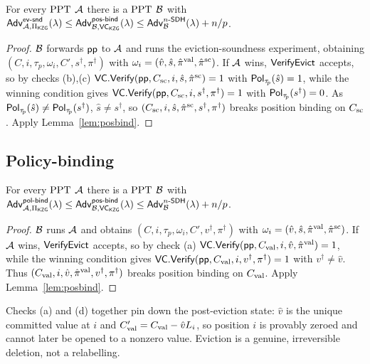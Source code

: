 \begin{theorem}\label{thm:evsnd}
For every $\mathrm{PPT}$ $\mathcal{A}$ there is a $\mathrm{PPT}$ $\mathcal{B}$ with
$\mathsf{Adv}^{\mathsf{ev\text{-}snd}}_{\mathcal{A},\Pi_{\mathsf{KZG}}}(\lambda)\le
 \mathsf{Adv}^{\mathsf{pos\text{-}bind}}_{\mathcal{B},\mathsf{VC}_{\mathsf{KZG}}}(\lambda)\le\mathsf{Adv}^{n\text{-}\mathsf{SDH}}_{\mathcal{B}}(\lambda)+n/p$.
\end{theorem}
\begin{proof}
$\mathcal{B}$ forwards $\mathsf{pp}$ to $\mathcal{A}$ and runs the eviction-soundness experiment, obtaining
$(C,i,\tau_{\!p},\omega_i,C',s^{\dagger},\pi^{\dagger})$ with
$\omega_i=(\hat v,\hat s,\hat\pi^{\mathrm{val}},\hat\pi^{\mathrm{sc}})$. If $\mathcal{A}$ wins,
$\mathsf{VerifyEvict}$ accepts, so by checks (b),(c)
$\mathsf{VC}.\mathsf{Verify}(\mathsf{pp},C_{\mathrm{sc}},i,\hat s,\hat\pi^{\mathrm{sc}})=1$ with $\mathsf{Pol}_{\tau_{\!p}}(\hat s)=1$,
while the winning condition gives
$\mathsf{VC}.\mathsf{Verify}(\mathsf{pp},C_{\mathrm{sc}},i,s^{\dagger},\pi^{\dagger})=1$ with
$\mathsf{Pol}_{\tau_{\!p}}(s^{\dagger})=0$. As $\mathsf{Pol}_{\tau_{\!p}}(\hat s)\neq
\mathsf{Pol}_{\tau_{\!p}}(s^{\dagger})$, $\hat s\neq s^{\dagger}$, so
$(C_{\mathrm{sc}},i,\hat s,\hat\pi^{\mathrm{sc}},s^{\dagger},\pi^{\dagger})$ breaks position binding
on $C_{\mathrm{sc}}$. Apply Lemma~\ref{lem:posbind}.
\end{proof}

\subsection{Policy-binding}

\begin{theorem}\label{thm:polbind}
For every $\mathrm{PPT}$ $\mathcal{A}$ there is a $\mathrm{PPT}$ $\mathcal{B}$ with
$\mathsf{Adv}^{\mathsf{pol\text{-}bind}}_{\mathcal{A},\Pi_{\mathsf{KZG}}}(\lambda)\le
 \mathsf{Adv}^{\mathsf{pos\text{-}bind}}_{\mathcal{B},\mathsf{VC}_{\mathsf{KZG}}}(\lambda)\le\mathsf{Adv}^{n\text{-}\mathsf{SDH}}_{\mathcal{B}}(\lambda)+n/p$.
\end{theorem}
\begin{proof}
$\mathcal{B}$ runs $\mathcal{A}$ and obtains
$(C,i,\tau_{\!p},\omega_i,C',v^{\dagger},\pi^{\dagger})$ with
$\omega_i=(\hat v,\hat s,\hat\pi^{\mathrm{val}},\hat\pi^{\mathrm{sc}})$. If $\mathcal{A}$ wins,
$\mathsf{VerifyEvict}$ accepts, so by check (a)
$\mathsf{VC}.\mathsf{Verify}(\mathsf{pp},C_{\mathrm{val}},i,\hat v,\hat\pi^{\mathrm{val}})=1$, while the winning condition gives
$\mathsf{VC}.\mathsf{Verify}(\mathsf{pp},C_{\mathrm{val}},i,v^{\dagger},\pi^{\dagger})=1$ with $v^{\dagger}\neq\hat v$.
Thus $(C_{\mathrm{val}},i,\hat v,\hat\pi^{\mathrm{val}},v^{\dagger},\pi^{\dagger})$ breaks position
binding on $C_{\mathrm{val}}$. Apply Lemma~\ref{lem:posbind}.
\end{proof}

\begin{remark}
Checks (a) and (d) together pin down the post-eviction state: $\hat v$ is the
unique committed value at $i$ and $C_{\mathrm{val}}'=C_{\mathrm{val}}-\hat v L_i$, so position $i$ is
provably zeroed and cannot later be opened to a nonzero value. Eviction is a
genuine, irreversible deletion, not a relabelling.
\end{remark}

